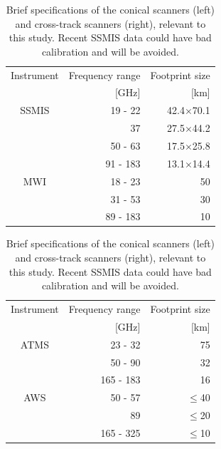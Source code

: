 \documentclass[12pt,oneside,a4paper]{article}
\begin{document}
\begin{table}[!t]
	\footnotesize
	\centering
	\caption{Brief specifications of the conical scanners (left) and
      cross-track scanners (right), relevant to this study. Recent
      SSMIS data could have bad calibration and will be avoided.
    }
	\label{tab:specifications_instruments}	
	\parbox{.45\linewidth}{
	\centering
	\begin{tabular}{crr}
	\toprule
		Instrument & Frequency range 	& Footprint size \\
					& [GHz]             & [km]     \\
		\midrule			
		SSMIS	   &19 - 22		& 42.4$\times$70.1	\\
				   &37          &27.5$\times$44.2  \\
				   &50 - 63       & 17.5$\times$25.8 \\
				   &91 - 183    &  13.1$\times$14.4\\
		\midrule
		MWI 	   &18 - 23 		&50\\
				   &31 - 53 		& 30\\
				   & 89 - 183 	& 10\\	
		\bottomrule		
	\end{tabular}
	}
\hfill
\parbox{.45\linewidth}{
	\centering
	\begin{tabular}{crr}
	\toprule
	Instrument & Frequency range 	& Footprint size \\
	& [GHz]             & [km]       \\
	\midrule			
	ATMS	    &23 - 32		& 75	\\
				&50 - 90        &32  \\
				&165 - 183        & 16 \\
	\midrule
	AWS 	   &50 - 57 		& $\le$40\\
			   &89 				& $\le$20\\
			   & 165 - 325 		& $\le$10\\	
	\bottomrule		
\end{tabular}
}
\end{table}
\end{document}
